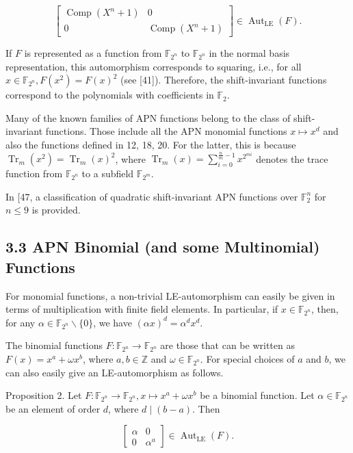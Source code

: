 \documentclass[10pt]{article}
\begin{document}
$$
\left[\begin{array}{cc}
\operatorname{Comp}\left(X^{n}+1\right) & 0 \\
0 & \operatorname{Comp}\left(X^{n}+1\right)
\end{array}\right] \in \operatorname{Aut}_{\mathrm{LE}}(F) .
$$

If $F$ is represented as a function from $\mathbb{F}_{2^{n}}$ to $\mathbb{F}_{2^{n}}$ in the normal basis representation, this automorphism corresponds to squaring, i.e., for all $x \in \mathbb{F}_{2^{n}}, F\left(x^{2}\right)=F(x)^{2}$ (see [41]). Therefore, the shift-invariant functions correspond to the polynomials with coefficients in $\mathbb{F}_{2}$.

Many of the known families of APN functions belong to the class of shift-invariant functions. Those include all the APN monomial functions $x \mapsto x^{d}$ and also the functions defined in 12, 18, 20. For the latter, this is because $\operatorname{Tr}_{m}\left(x^{2}\right)=\operatorname{Tr}_{m}(x)^{2}$, where $\operatorname{Tr}_{m}(x)=\sum_{i=0}^{\frac{n}{m}-1} x^{2^{m i}}$ denotes the trace function from $\mathbb{F}_{2^{n}}$ to a subfield $\mathbb{F}_{2^{m}}$.

In [47, a classification of quadratic shift-invariant APN functions over $\mathbb{F}_{2}^{n}$ for $n \leq 9$ is provided.

\subsection*{3.3 APN Binomial (and some Multinomial) Functions}
For monomial functions, a non-trivial LE-automorphism can easily be given in terms of multiplication with finite field elements. In particular, if $x \in \mathbb{F}_{2^{n}}$, then, for any $\alpha \in \mathbb{F}_{2^{n}} \backslash\{0\}$, we have $(\alpha x)^{d}=\alpha^{d} x^{d}$.

The binomial functions $F: \mathbb{F}_{2^{n}} \rightarrow \mathbb{F}_{2^{n}}$ are those that can be written as $F(x)= x^{a}+\omega x^{b}$, where $a, b \in \mathbb{Z}$ and $\omega \in \mathbb{F}_{2^{n}}$. For special choices of $a$ and $b$, we can also easily give an LE-automorphism as follows.

Proposition 2. Let $F: \mathbb{F}_{2^{n}} \rightarrow \mathbb{F}_{2^{n}}, x \mapsto x^{a}+\omega x^{b}$ be a binomial function. Let $\alpha \in \mathbb{F}_{2^{n}}$ be an element of order $d$, where $d \mid(b-a)$. Then

$$
\left[\begin{array}{cc}
\alpha & 0 \\
0 & \alpha^{a}
\end{array}\right] \in \operatorname{Aut}_{\mathrm{LE}}(F) .
$$
\end{document}
